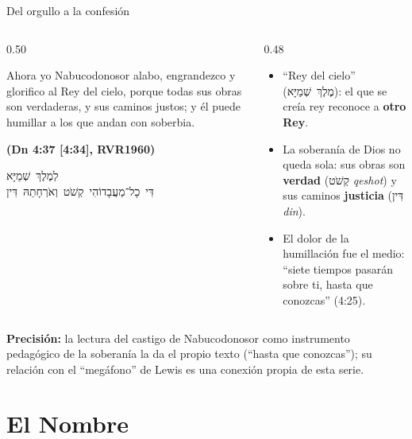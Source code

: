 \documentclass[hyperref={bookmarks=false},aspectratio=169]{beamer}
\newcommand{\heb}[1]{\mbox{\foreignlanguage{hebrew}{#1}}}
\newcommand{\fuente}[1]{\par\hfill{\upshape\bfseries\footnotesize\textcolor{azul}{#1}}}
\newcommand{\destacar}[1]{\textbf{\textcolor{azul}{#1}}}
\newcommand{\precision}[1]{{\footnotesize\color{gris}\textbf{Precisión:} #1}}
\begin{document}
\begin{frame}{Del orgullo a la confesión}
\begin{columns}[t,onlytextwidth]
\begin{column}{0.50\textwidth}
\begin{cita}Ahora yo Nabucodonosor alabo, engrandezco y glorifico al Rey del cielo, porque todas sus obras son verdaderas, y sus caminos justos; y él puede humillar a los que andan con soberbia.\fuente{(Dn 4:37 [4:34], RVR1960)}\end{cita}
\begin{center}\heb{לְמֶלֶךְ שְׁמַיָּא}\\ \heb{דִּי כָל־מַעֲבָדוֹהִי קְשֹׁט וְאֹרְחָתֵהּ דִּין}\end{center}
\end{column}
\begin{column}{0.48\textwidth}\small
\begin{itemize}
\item ``Rey del cielo'' (\heb{מֶלֶךְ שְׁמַיָּא}): el que se creía rey reconoce a \destacar{otro Rey}.
\item La soberanía de Dios no queda sola: sus obras son \destacar{verdad} (\heb{קְשֹׁט} \emph{qeshot}) y sus caminos \destacar{justicia} (\heb{דִּין} \emph{din}).
\item El dolor de la humillación fue el medio: ``siete tiempos pasarán sobre ti, hasta que conozcas'' (4:25).
\end{itemize}
\end{column}
\end{columns}\par\smallskip
\precision{la lectura del castigo de Nabucodonosor como instrumento pedagógico de la soberanía la da el propio texto (``hasta que conozcas''); su relación con el ``megáfono'' de Lewis es una conexión propia de esta serie.}
\end{frame}

\section{El Nombre}
\end{document}
